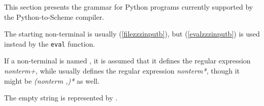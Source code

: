 This section presents the grammar for Python programs currently supported by the Python-to-Scheme compiler.

The starting non-terminal is usually  (\ref{filezzzinputb}), but \linebreak[4]  (\ref{evalzzzinputb}) is used instead by the \verb|eval| function.

If a non-terminal is named , it is assumed that it defines the regular expression \emph{nonterm+}, while  usually defines the regular expression \emph{nonterm*}, though it might be \emph{(nonterm ,)*} as well.

The empty string is represented by \greeke{}.